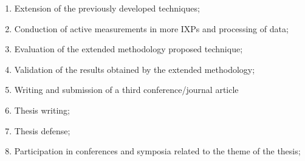 \begin{enumerate}
\item Extension of the previously developed techniques; \label{it:modelagem3}

\item Conduction of active measurements in more IXPs and processing of data; \label{it:coleta3}

\item Evaluation of the extended methodology proposed technique; \label{it:evaluation3}

\item Validation of the results obtained by the extended methodology; \label{it:validation3}

\item Writing and submission of a third conference/journal article \label{it:writing3}

\item Thesis writing; \label{it:redacao}

\item Thesis defense; \label{it:def-tese}

\item Participation in conferences and symposia related to the theme of the thesis; \label{it:part-cong}

\end{enumerate}


